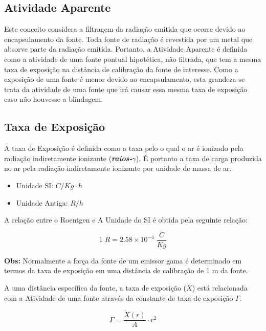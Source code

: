 \documentclass[11pt,a4paper]{article}
\begin{document}
		\subsection{Atividade Aparente}

			Este conceito considera a filtragem da radiação emitida que ocorre devido ao encapsulamento da fonte. Toda fonte de radiação é revestida por um metal que absorve parte da radiação emitida. Portanto, a Atividade Aparente é definida como a atividade de uma fonte pontual hipotética, não filtrada, que tem a mesma taxa de exposição na distância de calibração da fonte de interesse. Como a exposição de uma fonte é menor devido ao encapsulamento, esta grandeza se trata da atividade de uma fonte que irá causar essa mesma taxa de exposição caso não houvesse a blindagem.
	
		
		\subsection{Taxa de Exposição}

			A taxa de Exposição é definida como a taxa pelo o qual o ar é ionizado pela radiação indiretamente ionizante (\textbf{\textit{\textcolor{CarnationPink}{raios-$\gamma$}}}). É portanto a taxa de carga produzida no ar pela radiação indiretamente ionizante por unidade de massa de ar.

			\begin{itemize}
				\item Unidade SI: $C/Kg\cdot h$
				\item Unidade Antiga: $R / h$
			\end{itemize}

			A relação entre o Roentgen e A Unidade do SI é obtida pela seguinte relação:

			\begin{equation}
				1\;R = 2.58 \times 10^{-4}\; \frac{C}{Kg}
			\end{equation}

			\textbf{\textcolor{CarnationPink}{Obs:} } Normalmente a força da fonte de um emissor gama é determinado em termos da taxa de exposição em uma distância de calibração de 1 m da fonte.

			A uma distância específica da fonte, a taxa de exposição (\textbf{\textit{\textcolor{CarnationPink}{$\dot{X}$}}}) está relacionada com a Atividade de uma fonte através da constante de taxa de exposição $\Gamma$.

				\begin{equation}
					\Gamma = \frac{\dot{X}(r)}{A} \cdot r^2
				\end{equation}
\end{document}
